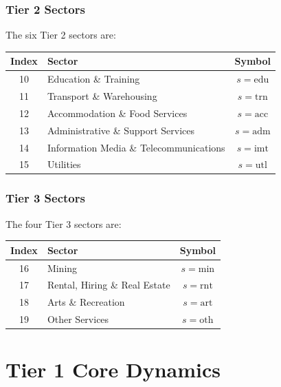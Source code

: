 \documentclass[11pt,a4paper]{article}
\begin{document}
\subsubsection*{Tier 2 Sectors}

The six Tier 2 sectors are:

\begin{center}
\begin{tabular}{clc}
\toprule
Index & Sector & Symbol \\
\midrule
10 & Education \& Training & $s = \text{edu}$ \\
11 & Transport \& Warehousing & $s = \text{trn}$ \\
12 & Accommodation \& Food Services & $s = \text{acc}$ \\
13 & Administrative \& Support Services & $s = \text{adm}$ \\
14 & Information Media \& Telecommunications & $s = \text{imt}$ \\
15 & Utilities & $s = \text{utl}$ \\
\bottomrule
\end{tabular}
\end{center}

\subsubsection*{Tier 3 Sectors}

The four Tier 3 sectors are:

\begin{center}
\begin{tabular}{clc}
\toprule
Index & Sector & Symbol \\
\midrule
16 & Mining & $s = \text{min}$ \\
17 & Rental, Hiring \& Real Estate & $s = \text{rnt}$ \\
18 & Arts \& Recreation & $s = \text{art}$ \\
19 & Other Services & $s = \text{oth}$ \\
\bottomrule
\end{tabular}
\end{center}

\section{Tier 1 Core Dynamics}
\label{sec:tier1}
\end{document}
